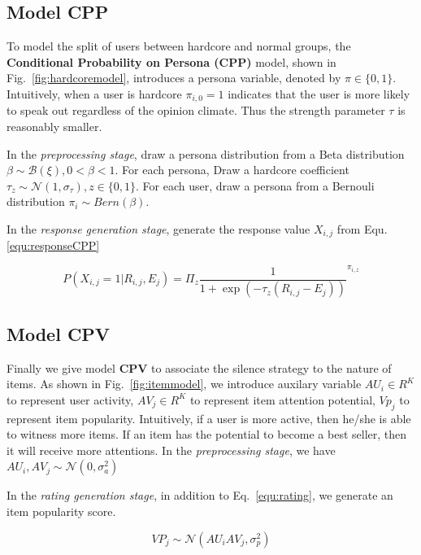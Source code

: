 \documentclass{sig-alternate}
\begin{document}
\subsection{Model CPP}
To model the split of users between hardcore and normal groups, the  \textbf{Conditional Probability on Persona (CPP)} model,  shown in Fig.~\ref{fig:hardcoremodel}, introduces a  persona variable,  denoted by $\pi \in \{0,1\}$. Intuitively, when a user is hardcore $\pi_{i,0}=1$ indicates that the user is more likely to speak out regardless of the opinion climate. Thus the strength parameter $\tau$ is reasonably smaller.  

In the \textit{preprocessing stage}, draw a persona distribution from a Beta distribution $\beta \sim \mathcal{B}(\xi), 0<\beta<1$. For each persona, Draw a hardcore coefficient $\tau_z \sim \mathcal{N}(1,\sigma_\tau), z\in \{0,1\}$. For each user, draw a persona from a Bernouli distribution $\pi_i \sim Bern (\beta)$. 

In the \textit{response generation stage}, generate the response value $X_{i,j}$ from Equ.\ref{equ:responseCPP}

\begin{equation}\label{equ:responseCPP}
 P(X_{i,j}=1|R_{i,j},E_j)=\Pi_z {\frac{1}{1+\exp{(-\tau_z(R_{i,j}-E_j))}}}^{\pi_{i,z}}
\end{equation}

\subsection{Model CPV}
Finally we give model \textbf{CPV} to associate the silence strategy to the nature of items. As shown in Fig.~\ref{fig:itemmodel}, we introduce auxilary variable $AU_i\in R^K$ to represent user activity, $AV_j\in R^K$ to represent item attention potential, $Vp_j$ to represent item popularity. Intuitively, if a user is more active, then he/she is able to witness more items. If an item has the potential to become a best seller, then it will receive more attentions. In the \textit{preprocessing stage}, we have  $AU_i, AV_j \sim \mathcal{N}(0,\sigma_a^2)$


In the \textit{rating generation stage}, in addition to Eq.~\ref{equ:rating}, we generate an item popularity score.

\begin{equation}\label{equ:popularity}
VP_j\sim \mathcal{N}(AU_i AV_j,\sigma_p^2) 
\end{equation} 
\end{document}
